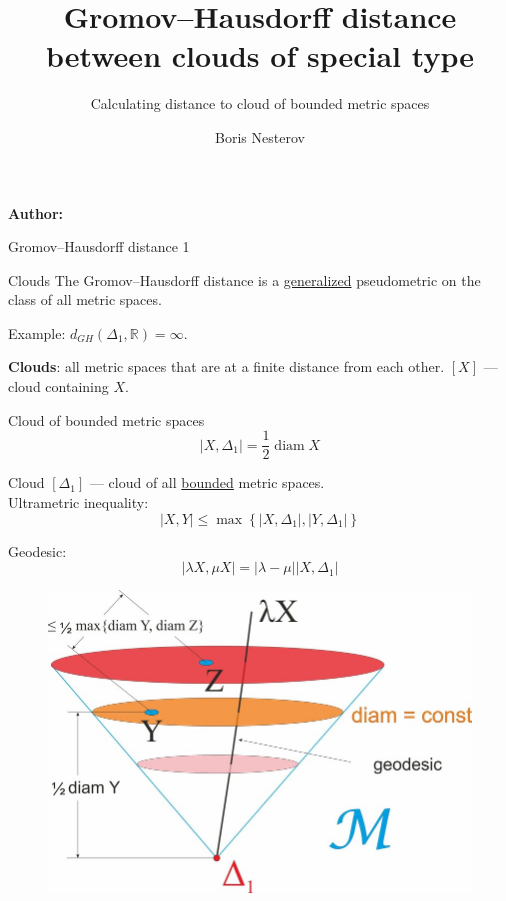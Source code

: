\documentclass[12pt]{beamer}
\title[Institute]{Gromov--Hausdorff distance between clouds of special type}
\subtitle{Calculating distance to cloud of bounded metric spaces}
\author[Boris Nesterov]{Boris Nesterov}
\institute[]{M. V. Lomonosov Moscow State University}
\date{\currentyear} %
\DeclareMathOperator{\diam}{diam}
\begin{document}
\begin{frame}{}
\vspace{\fill}


\Large
\color{main}
\inserttitle

\medskip

\large
\color{black}
\insertsubtitle

\vspace{\fill}

\footnotesize
\insertinstitute

\vspace{\fill}

\textbf{Author:} \insertauthor

\medskip

\insertdate

\vspace{\fill}
\end{frame}

\begin{frame}[allowframebreaks]{Gromov--Hausdorff distance}
1
\end{frame}

\begin{frame}[allowframebreaks]{Clouds}
The Gromov--Hausdorff distance is a \underline{generalized} pseudometric on the class of all metric spaces.

Example: $d_{GH}\left(\Delta_{1}, \mathbb{R}\right) = \infty$.

\textbf{Clouds}: all metric spaces that are at a finite distance from each other.
$[X]$ --- cloud containing $X$.
\end{frame}

\begin{frame}[allowframebreaks]{Cloud of bounded metric spaces}
\[|X,\Delta_1| = \frac 1 2 \diam X\]

Cloud $[\Delta_{1}]$ --- cloud of all \underline{bounded} metric spaces.\\
Ultrametric inequality:
\[\left|X,Y\right| \le \max\left\{\left|X,\Delta_{1}\right|,\left|Y,\Delta_{1}\right|\right\}\]

Geodesic:
\[\left|\lambda X, \mu X\right| = |\lambda - \mu||X, \Delta_1|\]
\scalebox{1}
{
\begin{figure}
    \centering
    \includegraphics[width=0.7\linewidth]{Gromov-Hausdorff-space-general-properties.jpg}
    \label{fig:enter-label}
\end{figure}
}
\end{frame}
\end{document}
